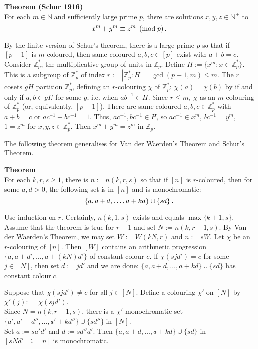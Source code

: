 \documentclass[a4paper]{article}
\let\oldendproof\endproof
\renewenvironment{proof}[1][\proofname]{%
  \oldproof[\scshape \noindent {\bfseries \text{Proof}}]%
}{\oldendproof}
\newenvironment{thm}[1]{
	\begin{framed}
	\noindent
	{\bfseries #1}\\}{
	\end{framed}
}
\newcommand{\ZZ}{\mathbb{Z}}
\begin{document}
\begin{thm}{Theorem (Schur 1916)}
For each $m \in \mathbb{N}$ and sufficiently large prime $p$,
there are solutions $x,y,z \in \mathbb{N}^+$ to\vspace*{-1mm}
\[ x^m + y^m \equiv z^m \pmod{p}\,.\vspace*{-2mm}\]
\end{thm}

\begin{proof}
By the finite version of Schur's theorem,
there is a large prime $p$ so that if $[p-1]$ is $m$-coloured,
then same-coloured $a,b,c\in[p]$ exist with $a+b=c$.
Consider $\ZZ_p^*$, the multiplicative group of units in $\ZZ_p$.
Define $H := \{x^m : x \in \ZZ_p^*\}$.
This is a subgroup of $\ZZ_p^*$ of index $r:= |\ZZ_p^* : H | = \gcd(p-1,m) \leq m$.
The $r$ cosets $gH$ partition $\ZZ_p^*$,
defining an $r$-colouring $\chi$ of $\ZZ_p^*$: $\chi(a) = \chi(b)$ by
if and only if $a,b \in gH$ for some $g$, i.e. when $ab^{-1} \in H$.
Since $r \leq m$, $\chi$ as an $m$-colouring of $\ZZ_p^*$ (or, equivalently, $[p-1]$).
There are same-coloured $a,b,c \in \ZZ_p^*$ with $a+b = c$ or $ac^{-1} + bc^{-1} = 1$.
Thus, $ac^{-1}, bc^{-1} \in H$,
so $ac^{-1} \in x^m$, $bc^{-1} = y^m$, $1 = z^m$ for $x,y,z \in \ZZ_p^*$.
Then $x^m + y^m = z^m$ in $\ZZ_p$.
\end{proof}

The following theorem generalises for Van der Waerden's Theorem and Schur's Theorem.

\begin{thm}{Theorem}
For each $k,r,s \geq 1$, there is $n:= n(k,r,s)$ so that if $[n]$ is $r$-coloured,
then for some $a,d > 0$, the following set is in $[n]$ and is monochromatic:\vspace*{-1mm}
\[\{a,a+d, \ldots, a +kd\} \cup \{ sd\}\,.\vspace*{-2mm}\]
\end{thm}

\begin{proof}
Use induction on $r$.
Certainly, $n(k,1,s)$ exists and equals $\max\{k+1,s\}$.
Assume that the theorem is true for $r-1$ and set $N:= n(k,r-1,s)$.
By Van der Waerden's Theorem, we may set $W:=W(kN,r)$ and $n:=sW$.
Let $\chi$ be an $r$-colouring of $[n]$.
Then $[W]$ contains an arithmetic progression $\{a, a + d', \ldots, a + (kN)d'\}$
of constant colour $c$.
If $\chi(sjd') = c$ for some $j \in [N]$, then set $d:=jd'$ and we are done:
$\{a,a+d,\ldots, a+kd\} \cup \{ sd\}$ has constant colour $c$.

Suppose that $\chi(sjd') \neq c$ for all $j \in [N]$.
Define a colouring $\chi'$ on $[N]$ by $\chi'(j) : = \chi(sjd')$. \\
Since $N = n(k,r-1,s)$,
there is a $\chi'$-monochromatic set $\{a', a' + d'' , \ldots, a' + kd''\} \cup\{sd''\}$ in $[N]$. \\
Set $a:= sa'd'$ and $d:= sd''d'$.
Then $\{a, a + d, \ldots, a +kd\} \cup \{sd\}$ in $[sNd'] \subseteq [n]$ is monochromatic.
\end{proof}
\end{document}
